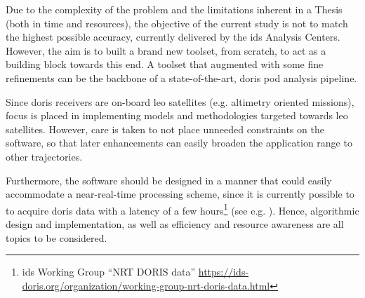 Due to the complexity of the problem and the limitations inherent in a Thesis 
(both in time and resources), the objective of the current study is not to match 
the highest possible accuracy, currently delivered by the \gls{ids} Analysis 
Centers. However, the aim is to built a brand new toolset, from scratch, to act as 
a building block towards this end. A toolset that augmented with some fine 
refinements can be the backbone of a state-of-the-art, \gls{doris} \gls{pod} 
analysis pipeline.

Since \gls{doris} receivers are on-board \gls{leo} satellites (e.g. altimetry 
oriented missions), focus is placed in implementing models and methodologies 
targeted towards \gls{leo} satellites. However, care is taken to not place 
unneeded constraints on the software, so that later enhancements can easily 
broaden the application range to other trajectories.

Furthermore, the software should be designed in a manner that could easily 
accommodate a near-real-time processing scheme, since it is currently possible to 
to acquire \gls{doris} data with a latency of a few hours\footnote{\gls{ids} Working Group ``NRT DORIS data'' \url{https://ids-doris.org/organization/working-group-nrt-doris-data.html}} (see e.g. \cite{Wang2022}).
Hence, algorithmic design and implementation, as well as efficiency and resource 
awareness are all topics to be considered.

\iffalse
This thesis is a study of orbit determination for \gls{leo} satellites, using the \gls{doris}
The aim is a robust methodology, providing
quality satellite state estimates, one though that can be efficient enough to be implemented for near-real time
applications. Hence, algorithmic design and implementation, as well as efficiency and resource awareness are all
topics to be considered. This thesis took place under a frame of an ambitious, nearly over optimistic goal, for
Dionysos Satellite Observatory to develop an orbit determination tool of its own; with this thesis, the groundwork
is more than laid. At international level, only a handful of such high-quality software tools exist, developed and
used by high caliber renowned institutions, with critical impact in the field of geodetic studies.
Guidelines set by the \gls{ids} act as the de-facto standard for orbit determination
via \gls{doris}. In this thesis we try to comply with this set of recommendations as close as possible, deviating when
needed to check and validate alternate or novel processing approaches.
\fi

